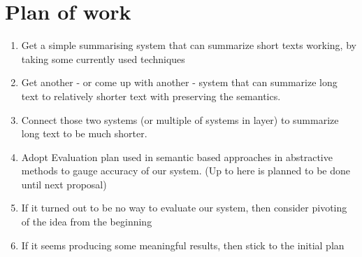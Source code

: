 \section{Plan of work}

\begin{enumerate}
  \item Get a simple summarising system that can summarize short texts working, by taking some currently used techniques
  \item Get another - or come up with another - system that can summarize long text to relatively shorter text with preserving the semantics.
  \item Connect those two systems (or multiple of systems in layer) to summarize long text to be much shorter.
  \item Adopt Evaluation plan used in semantic based approaches in abstractive methods to gauge accuracy of our system. (Up to here is planned to be done until next proposal)
  \item If it turned out to be no way to evaluate our system, then consider pivoting of the idea from the beginning
  \item If it seems producing some meaningful results, then stick to the initial plan
\end{enumerate}

